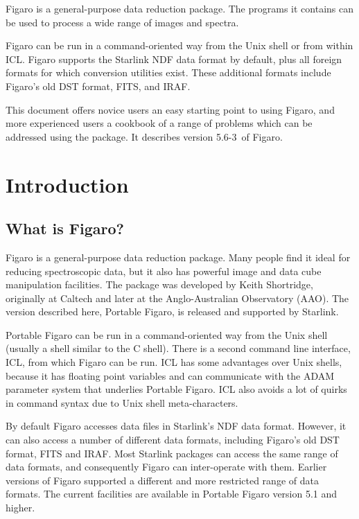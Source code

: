 \documentclass[11pt,twoside]{article}
\makeatletter
\newcommand{\Figaroversion}{5.6-3~}
\newcommand{\stardocinitials}  {SUN}
\newcommand{\stardocnumber}    {86.21}
\newcommand{\stardocabstract}  {
Figaro is a general-purpose data reduction package.
The programs it contains can be used to process a
wide range of images and spectra.

Figaro can be run in a command-oriented way from the
Unix shell or from within ICL\@.  Figaro supports the
Starlink NDF data format by default, plus all foreign formats
for which conversion utilities exist.
These additional formats include Figaro's old DST format, FITS, and IRAF.

This document offers novice users an easy starting
point to using Figaro, and more experienced users a
cookbook of a range of problems which can be addressed
using the package.  It describes version \Figaroversion of Figaro.
}
\newcommand{\stardocname}{\stardocinitials /\stardocnumber}
\newcommand{\htmladdnormallink}[2]{#1}
\newenvironment{latexonly}{}{}
\newcommand{\xlabel}[1]{}
\newcommand{\latexonlytoc}[0]{\tableofcontents}
\renewcommand{\thepage}{\roman{page}}
\makeatother
\begin{document}
\stardocabstract
 \newpage
 \begin{latexonly}
   \setlength{\parskip}{0mm}
   \latexonlytoc
   \setlength{\parskip}{\medskipamount}
 \end{latexonly}
\cleardoublepage
\renewcommand{\thepage}{\arabic{page}}
\setcounter{page}{1}

\section{\xlabel{introduction}\label{introduction}Introduction}
\markboth{Introduction}{\stardocname}

\subsection{\xlabel{what_is_figaro}What is Figaro?}

Figaro is a general-purpose data reduction package.
Many people find it ideal for reducing spectroscopic data, but it
also has powerful image and data cube manipulation facilities.
The package was developed by Keith Shortridge, originally at Caltech
and later at the Anglo-Australian Observatory (AAO).
The version described here, Portable Figaro, is released and supported
by \htmladdnormallink{Starlink}{http://www.starlink.ac.uk/}.

Portable Figaro can be run in a command-oriented way from the Unix
shell (usually a shell similar to the C shell).
There is a second command line interface, ICL, from which Figaro can be run.
ICL has some advantages over Unix shells, because it has floating point
variables and can communicate with the ADAM parameter system that
underlies Portable Figaro.
ICL also avoids a lot of quirks in command syntax due to Unix shell
meta-characters.

By default Figaro accesses data files in Starlink's NDF data format.
However, it can also access a number of different data formats, including
Figaro's old DST format, FITS and IRAF.
Most Starlink packages can access the same range of data formats, and
consequently Figaro can inter-operate with them.
Earlier versions of Figaro supported a different and more restricted range
of data formats.
The current facilities are available in Portable Figaro version 5.1 and
higher.
\end{document}
